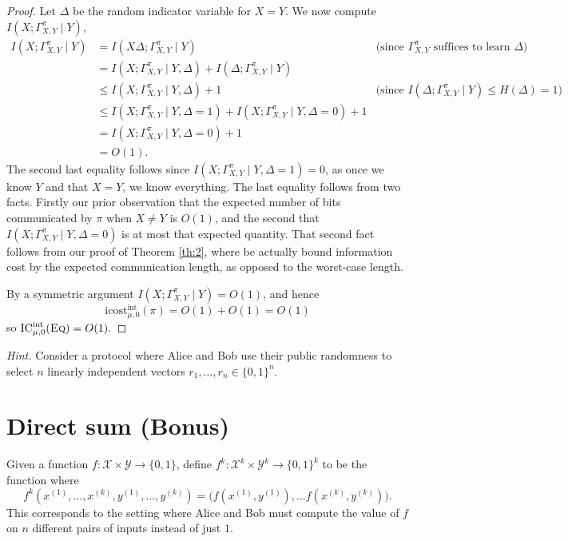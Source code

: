 \documentclass[11pt]{amsart}
\theoremstyle{plain}
\theoremstyle{definition}
\theoremstyle{plain}
\newcommand{\calX}{\mathcal{X}}
\newcommand{\calY}{\mathcal{Y}}
\newcommand{\Eq}{\textsc{Eq}}
\newcommand{\ICint}{\mathrm{IC}^{\mathrm{int}}}
\newcommand{\icostint}{\mathrm{icost}^{\mathrm{int}}}
\begin{document}
\begin{proof}
Let $\Delta$ be the random indicator variable for $X=Y$. We now compute $I(X;\Gamma^\pi_{X,Y}\mid Y)$,
\begin{align*}
I(X;\Gamma^\pi_{X,Y} \mid Y) &= I(X\Delta;\Gamma^\pi_{X,Y}\mid Y) &\text{(since $\Gamma^\pi_{X,Y}$ suffices to learn $\Delta$)} \\
	&= I(X;\Gamma^\pi_{X,Y}\mid Y, \Delta) + I(\Delta;\Gamma^\pi_{X,Y}\mid Y) \\
	&\leq  I(X;\Gamma^\pi_{X,Y}\mid Y, \Delta) + 1  &\text{(since $I(\Delta;\Gamma^\pi_{X,Y}\mid Y) \leq H(\Delta) = 1$)}\\
	&\leq  I(X;\Gamma^\pi_{X,Y}\mid Y, \Delta=1) +  I(X;\Gamma^\pi_{X,Y}\mid Y, \Delta=0) + 1 \\
	&=  I(X;\Gamma^\pi_{X,Y}\mid Y, \Delta=0) + 1 \\
	&= O(1).
\end{align*}
The second last equality follows since $I(X;\Gamma^\pi_{X,Y}\mid Y, \Delta=1)=0$, as once we know $Y$ and that $X=Y$, we know everything. The last equality follows from two facts. Firstly our prior observation that the expected number of bits communicated by $\pi$ when $X\neq Y$ is $O(1)$, and the second that $ I(X;\Gamma^\pi_{X,Y}\mid Y, \Delta=0) $ is at most that expected quantity. That second fact follows from our proof of Theorem \ref{th:2}, where be actually bound information cost by the expected communication length, as opposed to the worst-case length.

By a symmetric argument $I(X;\Gamma^\pi_{X,Y} \mid Y) = O(1)$, and hence
$$\icostint_{\mu,0}(\pi) = O(1) + O(1) = O(1)$$
so $\ICint_{\mu,0}(\Eq) = O(1).$
\end{proof}

\bigskip
\noindent \emph{Hint.} Consider a protocol where Alice and Bob use their public randomness to select $n$ linearly independent vectors $r_1,\ldots,r_n \in \{0,1\}^n$.


\newpage 
\section{Direct sum (Bonus)}

Given a function $f : \calX \times \calY \to \{0,1\}$, define $f^k : \calX^k \times \calY^k \to \{0,1\}^k$ to be the function where
\[
f^k(x^{(1)},\ldots,x^{(k)},y^{(1)},\ldots,y^{(k)}) = \big( f(x^{(1)},y^{(1)}), \ldots f(x^{(k)}, y^{(k)})\big).
\]
This corresponds to the setting where Alice and Bob must compute the value of $f$ on $n$ different pairs of inputs instead of just $1$.
\end{document}
